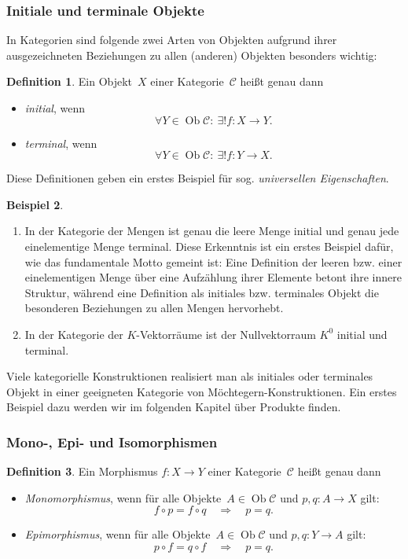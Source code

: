 \documentclass[a4paper,ngerman]{scrartcl}
\theoremstyle{definition}
\newtheorem{defn}{Definition}[section]
\newtheorem{bsp}[defn]{Beispiel}
\theoremstyle{plain}
\theoremstyle{remark}
\newcommand{\C}{\mathcal{C}}
\DeclareMathOperator{\Ob}{Ob}
\begin{document}
\subsubsection*{Initiale und terminale Objekte}

In Kategorien sind folgende zwei Arten von Objekten aufgrund ihrer
ausgezeichneten Beziehungen zu allen (anderen) Objekten besonders wichtig:
\begin{defn}
Ein Objekt~$X$ einer Kategorie~$\C$ heißt genau dann
\begin{itemize}
  \item \emph{initial}, wenn
    \[ \forall Y \in \Ob \C{:}\ \exists! f : X \to Y. \]
  \item \emph{terminal}, wenn
    \[ \forall Y \in \Ob \C{:}\ \exists! f : Y \to X. \]
\end{itemize}
\end{defn}
Diese Definitionen geben ein erstes Beispiel für sog. \emph{universellen
Eigenschaften}.

\begin{bsp}\begin{enumerate}
\item In der Kategorie der Mengen ist genau die leere Menge initial und
genau jede einelementige Menge terminal. Diese Erkenntnis ist ein erstes
Beispiel dafür, wie das fundamentale Motto gemeint ist: Eine Definition der
leeren bzw. einer einelementigen Menge über eine Aufzählung ihrer Elemente
betont ihre innere Struktur, während eine Definition als initiales bzw.
terminales Objekt die besonderen Beziehungen zu allen Mengen hervorhebt.
\item In der Kategorie der $K$-Vektorräume ist der Nullvektorraum $K^0$ initial
und terminal.
\end{enumerate}\end{bsp}
Viele kategorielle Konstruktionen realisiert man als initiales oder
terminales Objekt in einer geeigneten Kategorie von Möchtegern-Konstruktionen.
Ein erstes Beispiel dazu werden wir im folgenden Kapitel über Produkte finden.


\subsubsection*{Mono-, Epi- und Isomorphismen}

\begin{defn}
Ein Morphismus $f:X \to Y$ einer Kategorie~$\C$ heißt genau dann
\begin{itemize}
  \item \emph{Monomorphismus}, \tabto{3.35cm}wenn für alle Objekte~$A \in \Ob \C$
  und $p,q:A \to X$ gilt:
  \[ f \circ p = f \circ q \quad\Longrightarrow\quad p = q. \]
  \item \emph{Epimorphismus}, \tabto{3.35cm}wenn für alle Objekte~$A \in \Ob \C$
  und $p,q:Y \to A$ gilt:
  \[ p \circ f = q \circ f \quad\Longrightarrow\quad p = q. \]
\end{itemize}
\end{defn}
\end{document}

